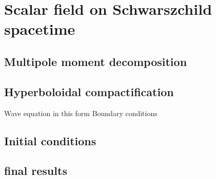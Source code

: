 \section{Scalar field on Schwarszchild spacetime}
\subsection{Multipole moment decomposition}
\subsection{Hyperboloidal compactification}
Wave equation in this form
Boundary conditions
\subsection{Initial conditions}
\subsection{final results}
